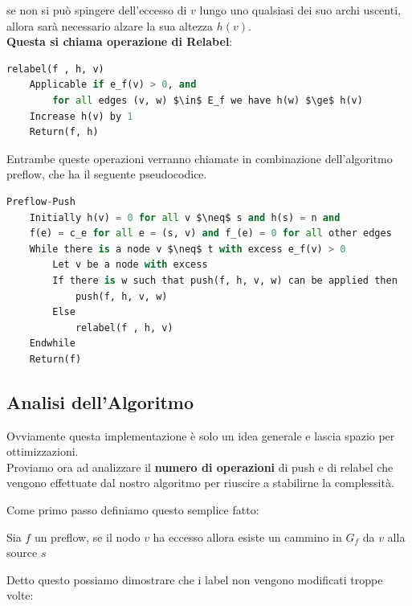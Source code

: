 se non si può spingere dell'eccesso di $v$ lungo uno qualsiasi dei suo archi
uscenti, allora sarà necessario alzare la sua altezza $h(v)$.\\

\textbf{Questa si chiama operazione di Relabel}:
\begin{lstlisting}[language=Python, mathescape=true]
relabel(f , h, v)
    Applicable if e_f(v) > 0, and
        for all edges (v, w) $\in$ E_f we have h(w) $\ge$ h(v)
    Increase h(v) by 1
    Return(f, h)
\end{lstlisting}

Entrambe queste operazioni verranno chiamate in combinazione dell'algoritmo
preflow, che ha il seguente pseudocodice.

\begin{lstlisting}[language=Python, mathescape=true]
Preflow-Push
    Initially h(v) = 0 for all v $\neq$ s and h(s) = n and
    f(e) = c_e for all e = (s, v) and f_(e) = 0 for all other edges
    While there is a node v $\neq$ t with excess e_f(v) > 0
        Let v be a node with excess
        If there is w such that push(f, h, v, w) can be applied then
            push(f, h, v, w)
        Else
            relabel(f , h, v)
    Endwhile
    Return(f)
\end{lstlisting}

\subsection{Analisi dell'Algoritmo}
Ovviamente questa implementazione è solo un idea generale e lascia spazio per
ottimizzazioni.\\

Proviamo ora ad analizzare il \textbf{numero di operazioni} di push e di relabel
che vengono effettuate dal nostro algoritmo per riuscire a stabilirne la
complessità.

Come primo passo definiamo questo semplice fatto:
\begin{myblockquote}
      \begin{minipage}{\textwidth}
            \begin{definition}
                  Sia $f$ un preflow, se il nodo $v$ ha eccesso allora esiste un cammino in
                  $G_f$ da $v$ alla source $s$
            \end{definition}
      \end{minipage}
\end{myblockquote}

Detto questo possiamo dimostrare che i label non vengono modificati troppe
volte:

